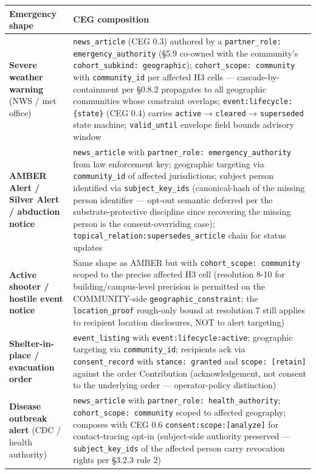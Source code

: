 \documentclass[10pt]{article}
\begin{document}
{\footnotesize
\begin{longtable}{|p{8.0cm}|p{8.0cm}|}\hline
\textbf{Emergency shape} & \textbf{CEG composition} \\ \hline\endhead
\textbf{Severe weather warning} (NWS / met office) & \texttt{news\_article} (CEG 0.3) authored by a \texttt{partner\_role: emergency\_authority} (§5.9 co-owned with the community's \texttt{cohort\_subkind: geographic}); \texttt{cohort\_scope: community} with \texttt{community\_id} per affected H3 cells — cascade-by-containment per §0.8.2 propagates to all geographic communities whose constraint overlaps; \texttt{event:lifecycle:\{state\}} (CEG 0.4) carries \texttt{active} → \texttt{cleared} → \texttt{superseded} state machine; \texttt{valid\_until} envelope field bounds advisory window \\ \hline
\textbf{AMBER Alert / Silver Alert / abduction notice} & \texttt{news\_article} with \texttt{partner\_role: emergency\_authority} from law enforcement key; geographic targeting via \texttt{community\_id} of affected jurisdictions; subject person identified via \texttt{subject\_key\_ids} (canonical-hash of the missing person identifier — opt-out semantic deferred per the substrate-protective discipline since recovering the missing person is the consent-overriding case); \texttt{topical\_relation:supersedes\_article} chain for status updates \\ \hline
\textbf{Active shooter / hostile event notice} & Same shape as AMBER but with \texttt{cohort\_scope: community} scoped to the precise affected H3 cell (resolution 8-10 for building/campus-level precision is permitted on the COMMUNITY-side \texttt{geographic\_constraint}; the \texttt{location\_proof} rough-only bound at resolution 7 still applies to recipient location disclosures, NOT to alert targeting) \\ \hline
\textbf{Shelter-in-place / evacuation order} & \texttt{event\_listing} with \texttt{event:lifecycle:active}; geographic targeting via \texttt{community\_id}; recipients ack via \texttt{consent\_record} with \texttt{stance: granted} and \texttt{scope: [retain]} against the order Contribution (acknowledgement, not consent to the underlying order — operator-policy distinction) \\ \hline
\textbf{Disease outbreak alert} (CDC / health authority) & \texttt{news\_article} with \texttt{partner\_role: health\_authority}; \texttt{cohort\_scope: community} scoped to affected geography; composes with CEG 0.6 \texttt{consent:scope:[analyze]} for contact-tracing opt-in (subject-side authority preserved — \texttt{subject\_key\_ids} of the affected person carry revocation rights per §3.2.3 rule 2) \\ \hline

\end{longtable}}
\end{document}

